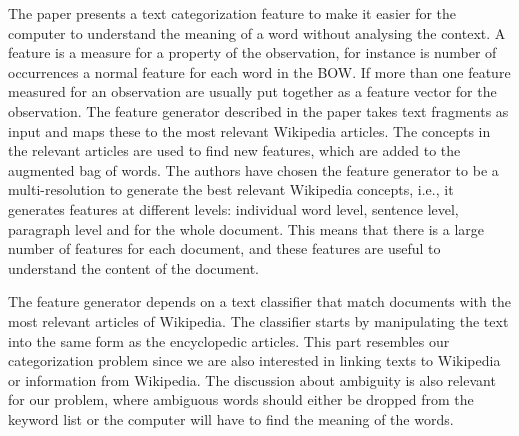 The paper presents a text categorization feature to make it easier for the computer to understand the meaning of a word without analysing the context. A feature is a measure for a property of the observation, for instance is number of occurrences a normal feature for each word in the  BOW. If more than one feature measured for an observation are  usually put together as a feature vector for the observation. The feature generator described in the paper takes text fragments as input and maps these to the most relevant Wikipedia articles. The concepts in the relevant articles are used to find new features, which are added to the augmented bag of words. The authors have chosen the feature generator to be a multi-resolution to generate the best relevant Wikipedia concepts, i.e., it generates features at different levels: individual word level, sentence level, paragraph level and for the whole document. This means that there is a large number of features for each document, and these features are useful to understand the content of the document. 

The feature generator depends on  a text classifier that match documents with the most relevant articles of Wikipedia. The classifier starts by manipulating the text into the same form as the encyclopedic articles. This part resembles our categorization problem since we are also interested in linking texts to Wikipedia or information from Wikipedia.  The discussion about ambiguity is also relevant for our problem, where ambiguous words should either be dropped from the keyword list or the computer will have to find the meaning of the words. 
